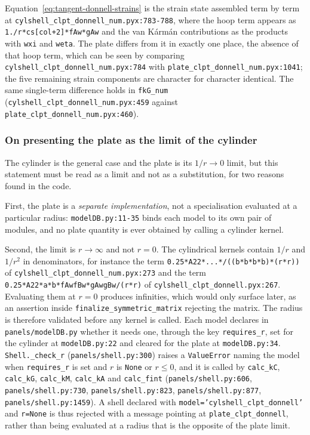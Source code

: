Equation~\ref{eq:tangent-donnell-strains} is the strain state assembled term by term at \texttt{cylshell\_clpt\_donnell\_num.pyx:783-788}, where the hoop term appears as \texttt{1./r*cs[col+2]*fAw*gAw} and the van K\'arm\'an contributions as the products with \texttt{wxi} and \texttt{weta}. The plate differs from it in exactly one place, the absence of that hoop term, which can be seen by comparing \texttt{cylshell\_clpt\_donnell\_num.pyx:784} with \texttt{plate\_clpt\_donnell\_num.pyx:1041}; the five remaining strain components are character for character identical. The same single-term difference holds in \texttt{fkG\_num} (\texttt{cylshell\_clpt\_donnell\_num.pyx:459} against \texttt{plate\_clpt\_donnell\_num.pyx:460}).

\subsubsection{On presenting the plate as the limit of the cylinder}\label{sec:tangent-donnell-limit}

The cylinder is the general case and the plate is its $1/r \to 0$ limit, but this statement must be read as a limit and not as a substitution, for two reasons found in the code.

First, the plate is a \emph{separate implementation}, not a specialisation evaluated at a particular radius: \texttt{modelDB.py:11-35} binds each model to its own pair of modules, and no plate quantity is ever obtained by calling a cylinder kernel.

Second, the limit is $r \to \infty$ and not $r = 0$. The cylindrical kernels contain $1/r$ and $1/r^2$ in denominators, for instance the term \texttt{0.25*A22*...*/((b*b*b*b)*(r*r))} of \texttt{cylshell\_clpt\_donnell\_num.pyx:273} and the term \texttt{0.25*A22*a*b*fAwfBw*gAwgBw/(r*r)} of \texttt{cylshell\_clpt\_donnell.pyx:267}. Evaluating them at $r = 0$ produces infinities, which would only surface later, as an assertion inside \texttt{finalize\_symmetric\_matrix} rejecting the matrix. The radius is therefore validated before any kernel is called. Each model declares in \texttt{panels/modelDB.py} whether it needs one, through the key \texttt{requires\_r}, set for the cylinder at \texttt{modelDB.py:22} and cleared for the plate at \texttt{modelDB.py:34}. \texttt{Shell.\_check\_r} (\texttt{panels/shell.py:300}) raises a \texttt{ValueError} naming the model when \texttt{requires\_r} is set and $r$ is \texttt{None} or $r \leq 0$, and it is called by \texttt{calc\_kC}, \texttt{calc\_kG}, \texttt{calc\_kM}, \texttt{calc\_kA} and \texttt{calc\_fint} (\texttt{panels/shell.py:606}, \texttt{panels/shell.py:730}, \texttt{panels/shell.py:823}, \texttt{panels/shell.py:877}, \texttt{panels/shell.py:1459}). A shell declared with \texttt{model='cylshell\_clpt\_donnell'} and \texttt{r=None} is thus rejected with a message pointing at \texttt{plate\_clpt\_donnell}, rather than being evaluated at a radius that is the opposite of the plate limit.

